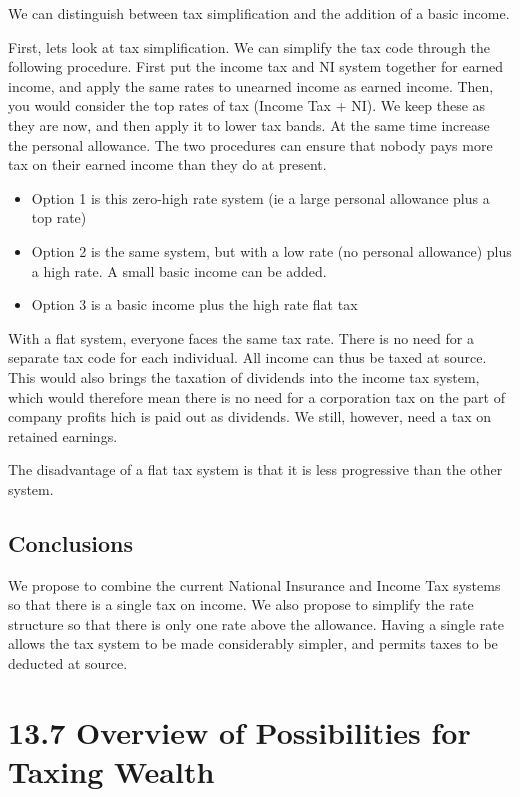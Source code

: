\documentclass[]{tufte-handout}
\providecommand{\tightlist}{%
  \setlength{\itemsep}{0pt}\setlength{\parskip}{0pt}}
\begin{document}
We can distinguish between tax simplification and the addition of a
basic income.

First, lets look at tax simplification. We can simplify the tax code
through the following procedure. First put the income tax and NI system
together for earned income, and apply the same rates to unearned income
as earned income. Then, you would consider the top rates of tax (Income
Tax + NI). We keep these as they are now, and then apply it to lower tax
bands. At the same time increase the personal allowance. The two
procedures can ensure that nobody pays more tax on their earned income
than they do at present.

\begin{itemize}
\tightlist
\item
  Option 1 is this zero-high rate system (ie a large personal allowance
  plus a top rate)
\item
  Option 2 is the same system, but with a low rate (no personal
  allowance) plus a high rate. A small basic income can be added.
\item
  Option 3 is a basic income plus the high rate flat tax
\end{itemize}

With a flat system, everyone faces the same tax rate. There is no need
for a separate tax code for each individual. All income can thus be
taxed at source. This would also brings the taxation of dividends into
the income tax system, which would therefore mean there is no need for a
corporation tax on the part of company profits hich is paid out as
dividends. We still, however, need a tax on retained earnings.

The disadvantage of a flat tax system is that it is less progressive
than the other system.

\hypertarget{conclusions-3}{%
\subsection{Conclusions}\label{conclusions-3}}

We propose to combine the current National Insurance and Income Tax
systems so that there is a single tax on income. We also propose to
simplify the rate structure so that there is only one rate above the
allowance. Having a single rate allows the tax system to be made
considerably simpler, and permits taxes to be deducted at source.

\hypertarget{overview-of-possibilities-for-taxing-wealth}{%
\section{13.7 Overview of Possibilities for Taxing
Wealth}\label{overview-of-possibilities-for-taxing-wealth}}
\end{document}
